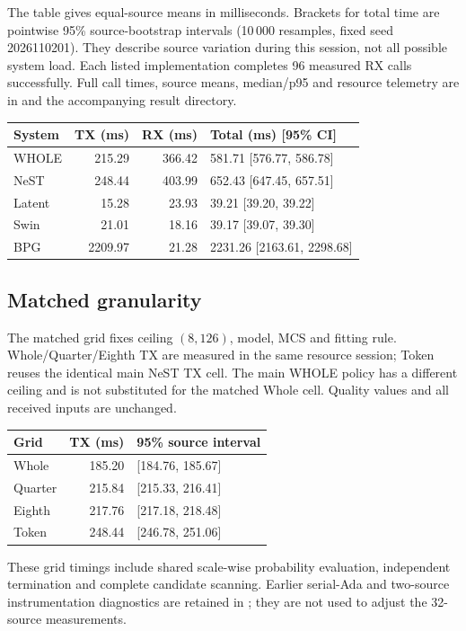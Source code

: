 \documentclass[10pt,letterpaper]{article}
\begin{document}
The table gives equal-source means in milliseconds. Brackets for total time are pointwise 95\% source-bootstrap intervals (10\,000 resamples, fixed seed 2026110201). They describe source variation during this session, not all possible system load. Each listed implementation completes 96 measured RX calls successfully. Full call times, source means, median/p95 and resource telemetry are in  and the accompanying result directory.

\begin{longtable}{@{}lrrl@{}}\toprule
System & TX (ms) & RX (ms) & Total (ms) [95\% CI]\\\midrule\endhead
WHOLE & 215.29 & 366.42 & 581.71 [576.77, 586.78]\\
NeST & 248.44 & 403.99 & 652.43 [647.45, 657.51]\\
Latent & 15.28 & 23.93 & 39.21 [39.20, 39.22]\\
Swin & 21.01 & 18.16 & 39.17 [39.07, 39.30]\\
BPG & 2209.97 & 21.28 & 2231.26 [2163.61, 2298.68]\\
\bottomrule\end{longtable}
\subsection{Matched granularity}\label{sup:timing-grid}
The matched grid fixes ceiling $(8,126)$, model, MCS and fitting rule. Whole/Quarter/Eighth TX are measured in the same resource session; Token reuses the identical main NeST TX cell. The main WHOLE policy has a different ceiling and is not substituted for the matched Whole cell. Quality values and all received inputs are unchanged.

\begin{longtable}{@{}lrl@{}}\toprule
Grid & TX (ms) & 95\% source interval\\\midrule\endhead
Whole & 185.20 & [184.76, 185.67]\\
Quarter & 215.84 & [215.33, 216.41]\\
Eighth & 217.76 & [217.18, 218.48]\\
Token & 248.44 & [246.78, 251.06]\\
\bottomrule\end{longtable}
These grid timings include shared scale-wise probability evaluation, independent termination and complete candidate scanning. Earlier serial-Ada and two-source instrumentation diagnostics are retained in ; they are not used to adjust the 32-source measurements.
\end{document}
